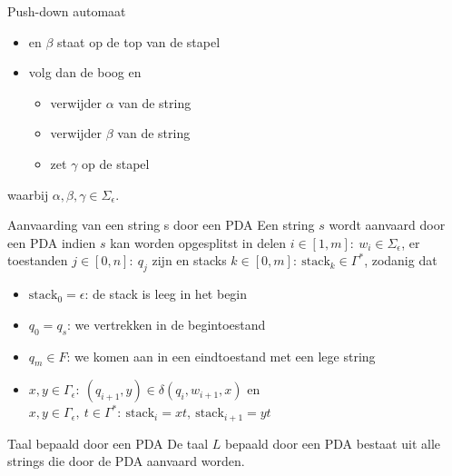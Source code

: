 \begin{theo}{Push-down automaat}
\begin{itemize}
        \item en $\beta$ staat op de top van de stapel
        \item 
            volg dan de boog en 
            \begin{itemize}
                \item verwijder $\alpha$ van de string
                \item verwijder $\beta$ van de string
                \item zet $\gamma$ op de stapel
            \end{itemize}
    \end{itemize}
    waarbij $\alpha, \beta, \gamma \in \Sigma_{\epsilon}$.
\end{theo}

\begin{theo}{Aanvaarding van een string s door een PDA}
    Een string $s$ wordt aanvaard door een PDA indien $s$ kan worden opgesplitst in delen $i \in [1,m]: \ w_i \in \Sigma_\epsilon$, er toestanden $j \in [0,n]: \ q_j$ zijn en 
    stacks $k \in [0,m]: \ \text{stack}_k \in \Gamma^*$, zodanig dat 
    \begin{itemize}
        \item $\text{stack}_0 = \epsilon$: de stack is leeg in het begin
        \item $q_0 = q_s$: we vertrekken in de begintoestand
        \item $q_m \in F$: we komen aan in een eindtoestand met een lege string
        \item $x,y \in \Gamma_\epsilon: \ (q_{i+1},y) \in \delta(q_i,w_{i+1},x)$ en $x,y \in \Gamma_\epsilon, \ t \in \Gamma^*: \ \text{stack}_i = xt, \ \text{stack}_{i+1} = yt$
    \end{itemize}  
    \vspace{-0.3cm}
\end{theo}

\begin{theo}{Taal bepaald door een PDA}
    \vspace{-0.1cm}
    De taal $L$ bepaald door een PDA bestaat uit alle strings die door de PDA
    aanvaard worden.
    \vspace{-0.1cm}
\end{theo}

\newpage

